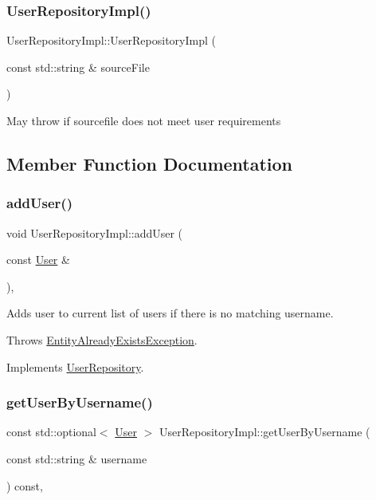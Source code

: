 \subsubsection{\texorpdfstring{User\+Repository\+Impl()}{UserRepositoryImpl()}}
{\footnotesize\ttfamily User\+Repository\+Impl\+::\+User\+Repository\+Impl (\begin{DoxyParamCaption}\item[{const std\+::string \&}]{source\+File }\end{DoxyParamCaption})}

May throw if sourcefile does not meet user requirements 

\subsection{Member Function Documentation}
\mbox{\label{classUserRepositoryImpl_a61a12165d5160621002184655ab1a809}} 
\subsubsection{\texorpdfstring{add\+User()}{addUser()}}
{\footnotesize\ttfamily void User\+Repository\+Impl\+::add\+User (\begin{DoxyParamCaption}\item[{const \hyperlink{classUser}{User} \&}]{ }\end{DoxyParamCaption})\hspace{0.3cm}{\ttfamily [override]}, {\ttfamily [virtual]}}

Adds user to current list of users if there is no matching username.

Throws \hyperlink{structEntityAlreadyExistsException}{Entity\+Already\+Exists\+Exception}. 

Implements \hyperlink{classUserRepository_a0c4379dccea3126340993453b8156787}{User\+Repository}.

\mbox{\label{classUserRepositoryImpl_a4da14e2e63ff2971a81ab980994eb585}} 
\subsubsection{\texorpdfstring{get\+User\+By\+Username()}{getUserByUsername()}}
{\footnotesize\ttfamily const std\+::optional$<$ \hyperlink{classUser}{User} $>$ User\+Repository\+Impl\+::get\+User\+By\+Username (\begin{DoxyParamCaption}\item[{const std\+::string \&}]{username }\end{DoxyParamCaption}) const\hspace{0.3cm}{\ttfamily [override]}, {\ttfamily [virtual]}}

